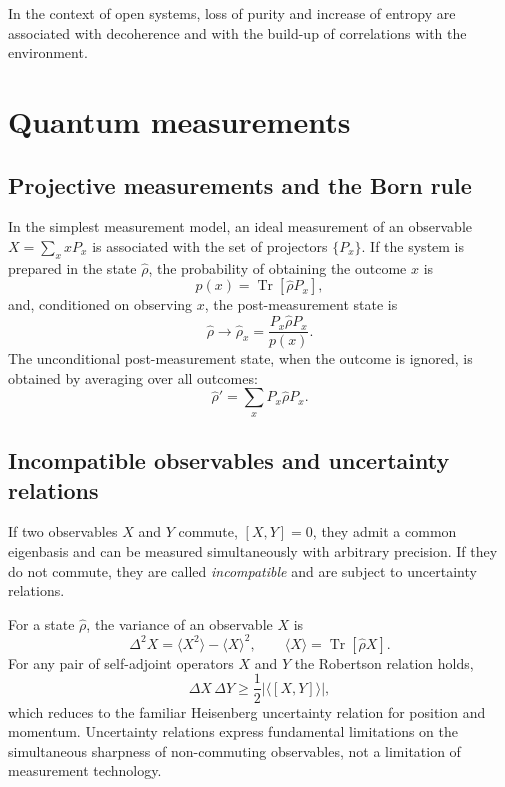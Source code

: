 In the context of open systems, loss of purity and increase of entropy are associated with decoherence and with the build-up of correlations with the environment.

\section{Quantum measurements}
\label{sec:measurements}

\subsection{Projective measurements and the Born rule}

In the simplest measurement model, an ideal measurement of an observable $X = \sum_x x P_x$ is associated with the set of projectors $\{P_x\}$. 
If the system is prepared in the state $\hat{\rho}$, the probability of obtaining the outcome $x$ is
\begin{equation}
	p(x) = \operatorname{Tr}[\hat{\rho} P_x],
\end{equation}
and, conditioned on observing $x$, the post-measurement state is
\begin{equation}
	\hat{\rho} \longrightarrow \hat{\rho}_x =
	\frac{P_x \hat{\rho} P_x}{p(x)}.
\end{equation}
The unconditional post-measurement state, when the outcome is ignored, is obtained by averaging over all outcomes:
\begin{equation}
	\hat{\rho}' = \sum_x P_x \hat{\rho} P_x.
\end{equation}

\subsection{Incompatible observables and uncertainty relations}

If two observables $X$ and $Y$ commute, $[X,Y] = 0$, they admit a common eigenbasis and can be measured simultaneously with arbitrary precision. 
If they do not commute, they are called \emph{incompatible} and are subject to uncertainty relations.

For a state $\hat{\rho}$, the variance of an observable $X$ is 
\begin{equation}
	\Delta^2 X = \langle X^2 \rangle - \langle X \rangle^2,
	\qquad
	\langle X \rangle = \operatorname{Tr}[\hat{\rho} X].
\end{equation}
For any pair of self-adjoint operators $X$ and $Y$ the Robertson relation holds,
\begin{equation}
	\Delta X \, \Delta Y \geq \frac{1}{2} \left| \langle [X,Y] \rangle \right|,
\end{equation}
which reduces to the familiar Heisenberg uncertainty relation for position and momentum. 
Uncertainty relations express fundamental limitations on the simultaneous sharpness of non-commuting observables, not a limitation of measurement technology.


